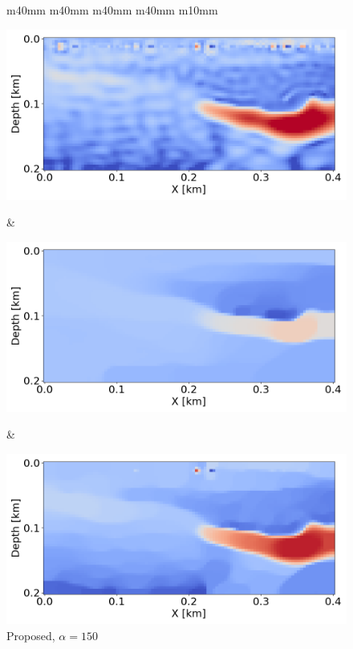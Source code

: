 \begin{figure}[htbp]
    \centering
    \begin{tabular}{m{40mm} m{40mm} m{40mm} m{40mm} m{10mm}}
        \begin{minipage}[b]{\linewidth}
            \centering
            \includegraphics[width=\linewidth]{public/gradient_noisy}
            \vspace{-9mm}
            \caption*{}
            \vspace{1mm}
        \end{minipage} &
        \hspace{-5mm}
        \begin{minipage}[b]{\linewidth}
            \centering
            \includegraphics[width=\linewidth]{public/alpha_150_noisy}
            \vspace{-7mm}
            \caption*{Proposed, $\alpha = 150$}
            \vspace{1mm}
        \end{minipage} &
        \hspace{-10mm}
        \begin{minipage}[b]{\linewidth}
            \centering
            \includegraphics[width=\linewidth]{public/alpha_350_noisy}

\end{minipage}
\end{tabular}
\end{figure}
